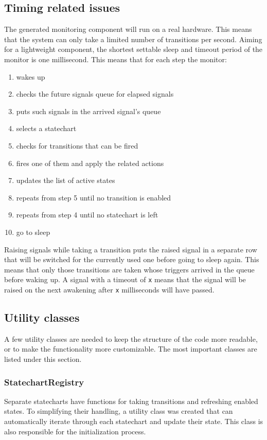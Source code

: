 \documentclass{book}
\begin{document}
{  \subsection{Timing related issues}
The generated monitoring component will run on a real hardware. This means that the system can only take a limited number of transitions per second. Aiming for a lightweight component, the shortest settable sleep and timeout period of the monitor is one millisecond. This means that for each step the monitor:
\begin{enumerate}
  \item wakes up
  \item checks the future signals queue for elapsed signals
  \item puts such signals in the arrived signal's queue
  \item selects a statechart
  \item checks for transitions that can be fired
  \item fires one of them and apply the related actions
  \item updates the list of active states
  \item repeats from step 5 until no transition is enabled
  \item repeats from step 4 until no statechart is left
  \item go to sleep
\end{enumerate}
Raising signals while taking a transition puts the raised signal in a separate row that will be switched for the currently used one before going to sleep again. This means that only those transitions are taken whose triggers arrived in the queue before waking up. A signal with a timeout of \verb!x! means that the signal will be raised on the next awakening after \verb!x! milliseconds will have passed.
  \subsection{Utility classes}
A few utility classes are needed to keep the structure of the code more readable, or to make the functionality more customizable. The most important classes are listed under this section.
    \subsubsection{StatechartRegistry}
Separate statecharts have functions for taking transitions and refreshing enabled states. To simplifying their handling, a utility class was created that can automatically iterate through each statechart and update their state. This class is also responsible for the initialization process.
}
\end{document}
